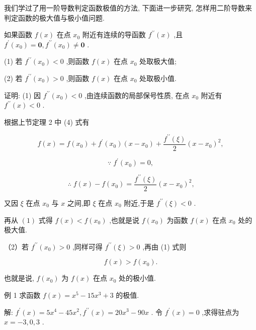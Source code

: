 \documentclass[lang=cn,newtx,12pt,scheme=chinese]{elegantbook}
\begin{document}
我们学过了用一阶导数判定函数极值的方法, 下面进一步研究, 怎样用二阶导数来判定函数的极大值与极小值问题.
\begin{theorem}[定理]

如果函数 \(f\left( x\right)\) 在点 \({x}_{0}\) 附近有连续的导函数 \({f}^{\prime \prime }\left( x\right)\) ,且 \({f}^{\prime }\left( {x}_{0}\right) = \mathbf{0},{f}^{\prime \prime }\left( {x}_{0}\right) \neq \mathbf{0}\) .

(1) 若 \({f}^{\prime \prime }\left( {x}_{0}\right) < 0\) ,则函数 \(f\left( x\right)\) 在点 \({x}_{0}\) 处取极大值;

(2) 若 \({f}^{\prime \prime }\left( {x}_{0}\right) > 0\) ,则函数 \(f\left( x\right)\) 在点 \({x}_{0}\) 处取极小值.

\end{theorem}

证明: (1) 因 \({f}^{\prime \prime }\left( {x}_{0}\right) < 0\) ,由连续函数的局部保号性质, 在点 \({x}_{0}\) 附近有 \({f}^{\prime \prime }\left( x\right) < 0\) .

根据上节定理 2 中 (4) 式有

\[
f\left( x\right) = f\left( {x}_{0}\right) + {f}^{\prime }\left( {x}_{0}\right) \left( {x - {x}_{0}}\right) + \frac{{f}^{\prime \prime }\left( \xi \right) }{2}{\left( x - {x}_{0}\right) }^{2},
\]

\[
\because \;{f}^{\prime }\left( {x}_{0}\right) = 0,
\]

\[
\therefore \;f\left( x\right) - f\left( {x}_{0}\right) = \frac{{f}^{\prime \prime }\left( \xi \right) }{2}{\left( x - {x}_{0}\right) }^{2}\text{,} \tag{1}
\]

又因 \(\xi\) 在点 \({x}_{0}\) 与 \(x\) 之间,即 \(\xi\) 在点 \({x}_{0}\) 附近,于是 \({f}^{\prime \prime }\left( \xi \right) < 0\) .

再从 \(\left( 1\right)\) 式得 \(f\left( x\right) < f\left( {x}_{0}\right)\) ,也就是说 \(f\left( {x}_{0}\right)\) 为函数 \(f\left( x\right)\) 在点 \({x}_{0}\) 处的极大值.

（2）若 \({f}^{\prime \prime }\left( {x}_{0}\right) > 0\) ,同样可得 \({f}^{\prime \prime }\left( \xi \right) > 0\) ,再由 (1) 式则

\[
f\left( x\right) > f\left( {x}_{0}\right) \text{.}
\]

也就是说, \(f\left( {x}_{0}\right)\) 为 \(f\left( x\right)\) 在点 \({x}_{0}\) 处的极小值.

例 1 求函数 \(f\left( x\right) = {x}^{5} - {15}{x}^{3} + 3\) 的极值.

解: \({f}^{\prime }\left( x\right) = 5{x}^{4} - {45}{x}^{2},{f}^{\prime \prime }\left( x\right) = {20}{x}^{3} - {90x}\) . 令 \({f}^{\prime }\left( x\right) = 0\) ,求得驻点为 \(x = - 3,0,3\) .
\end{document}
